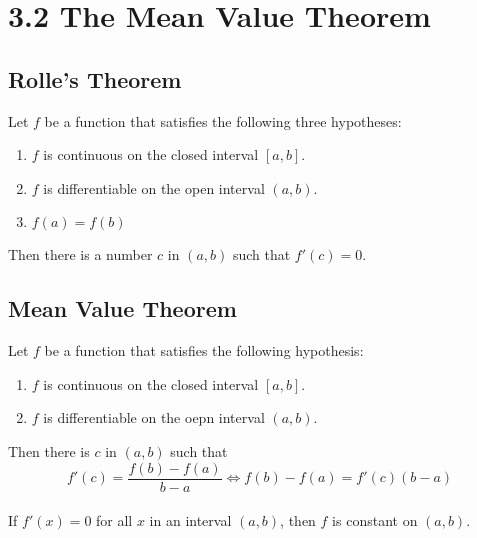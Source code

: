 %
%

\section*{3.2 The Mean Value Theorem}

\subsection*{Rolle's Theorem}

Let \(f\) be a function that satisfies the following three hypotheses:
\begin{enumerate}
    \item \(f\) is continuous on the closed interval \([a, b]\).
    \item \(f\) is differentiable on the open interval \((a, b)\).
    \item \(f(a)=f(b)\)
\end{enumerate}
Then there is a number \(c\) in \((a, b)\) such that \(f'(c)=0\).

\subsection*{Mean Value Theorem}

Let \(f\) be a function that satisfies the following hypothesis:
\begin{enumerate}
    \item \(f\) is continuous on the closed interval \([a, b]\).
    \item \(f\) is differentiable on the oepn interval \((a, b)\).
\end{enumerate}
Then there is \(c\) in \((a, b)\) such that
$$f'(c)=\frac{f(b)-f(a)}{b-a} \Leftrightarrow f(b)-f(a)=f'(c)(b-a)$$
\\
If \(f'(x)=0\) for all \(x\) in an interval \((a, b)\), then \(f\) is constant on \((a, b)\).

